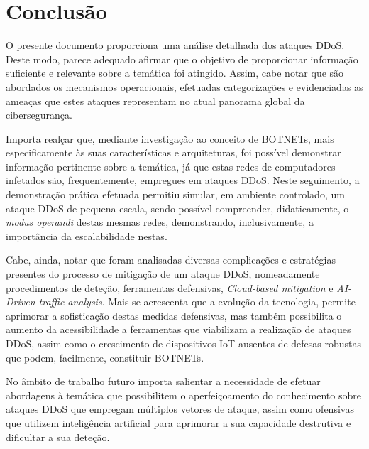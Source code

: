 \section{Conclusão}
O presente documento proporciona uma análise detalhada dos ataques DDoS. Deste modo, parece adequado afirmar que o objetivo de proporcionar informação suficiente e relevante sobre a temática foi atingido. Assim, cabe notar que são abordados os mecanismos operacionais, efetuadas categorizações e evidenciadas as ameaças que estes ataques representam no atual panorama global da cibersegurança.


Importa realçar que, mediante investigação ao conceito de BOTNETs, mais especificamente às suas características e arquiteturas, foi possível demonstrar informação pertinente sobre a temática, já que estas redes de computadores infetados são, frequentemente, empregues em ataques DDoS. Neste seguimento, a demonstração prática efetuada permitiu simular, em ambiente controlado, um ataque DDoS de pequena escala, sendo possível compreender, didaticamente, o \textit{modus operandi} destas mesmas redes, demonstrando, inclusivamente, a importância da escalabilidade nestas.

Cabe, ainda, notar que foram analisadas diversas complicações e estratégias presentes do processo de mitigação de um ataque DDoS, nomeadamente procedimentos de deteção, ferramentas defensivas, \textit{Cloud-based mitigation} e \textit{AI-Driven traffic analysis}. Mais se acrescenta que a evolução da tecnologia, permite aprimorar a sofisticação destas medidas defensivas, mas também possibilita o aumento da acessibilidade a ferramentas que viabilizam a realização de ataques DDoS, assim como o crescimento de dispositivos IoT ausentes de defesas robustas que podem, facilmente, constituir BOTNETs.


No âmbito de trabalho futuro importa salientar a necessidade de efetuar abordagens à temática que possibilitem o aperfeiçoamento do conhecimento sobre ataques DDoS que empregam múltiplos vetores de ataque, assim como ofensivas que utilizem inteligência artificial para aprimorar a sua capacidade destrutiva e dificultar a sua deteção.